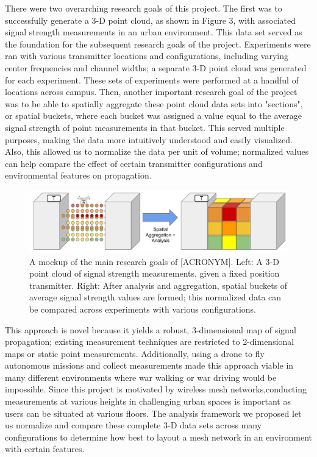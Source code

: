 \documentclass[pageno]{jpaper}
\begin{document}
There were two overarching research goals of this project. The first was to successfully generate a 3-D point cloud, as shown in Figure 3, with associated signal strength measurements in an urban environment. This data set served as the foundation for the subsequent research goals of the project. Experiments were ran with various transmitter locations and configurations, including varying center frequencies and channel widths; a separate 3-D point cloud was generated for each experiment. These sets of experiments were performed at a handful of locations across campus. Then, another important research goal of the project was to be able to spatially aggregate these point cloud data sets into "sections", or spatial buckets, where each bucket was assigned a value equal to the average signal strength of point measurements in that bucket. This served multiple purposes, making the data more intuitively understood and easily visualized. Also, this allowed us to normalize the data per unit of volume; normalized values can help compare the effect of certain transmitter configurations and environmental features on propagation.

\begin{figure}[h]
	\caption{A mockup of the main research goals of [ACRONYM]. Left: A 3-D point cloud of signal strength measurements, given a fixed position transmitter. Right: After analysis and aggregation, spatial buckets of average signal strength values are formed; this normalized data can be compared across experiments with various configurations.}
	\includegraphics{measurement_goal}
	\centering
\end{figure}

This approach is novel because it yields a robust, 3-dimensional map of signal propagation; existing measurement techniques are restricted to 2-dimensional maps or static point measurements. Additionally, using a drone to fly autonomous missions and collect measurements made this approach viable in many different environments where war walking or war driving would be impossible. Since this project is motivated by wireless mesh networks,conducting measurements at various heights in challenging urban spaces is important as users can be situated at various floors. 
The analysis framework we proposed let us normalize and compare these complete 3-D data sets across many configurations to determine how best to layout a mesh network in an environment with certain features.
\end{document}
